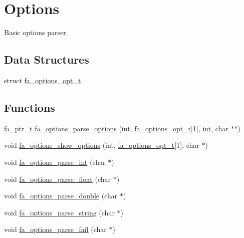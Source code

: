 \hypertarget{group___fa_options}{\section{Options}
\label{group___fa_options}
}


Basic options parser.  


\subsection*{Data Structures}
\begin{DoxyCompactItemize}
\item 
struct \hyperlink{structfa__options__opt__t}{fa\-\_\-options\-\_\-opt\-\_\-t}
\end{DoxyCompactItemize}
\subsection*{Functions}
\begin{DoxyCompactItemize}
\item 
\hyperlink{group___fa_ga915ddeae99ad7568b273d2b876425197}{fa\-\_\-ptr\-\_\-t} \hyperlink{group___fa_options_gafcbb5b5e138d56f49b6b9036d3ce4898}{fa\-\_\-options\-\_\-parse\-\_\-options} (int, \hyperlink{structfa__options__opt__t}{fa\-\_\-options\-\_\-opt\-\_\-t}\mbox{[}1\mbox{]}, int, char $\ast$$\ast$)
\item 
void \hyperlink{group___fa_options_ga9920fa60be31044dc153cf3de05a5c62}{fa\-\_\-options\-\_\-show\-\_\-options} (int, \hyperlink{structfa__options__opt__t}{fa\-\_\-options\-\_\-opt\-\_\-t}\mbox{[}1\mbox{]}, char $\ast$)
\item 
void \hyperlink{group___fa_options_gabff1121d255ac7d409ca0c8e8f2f1dff}{fa\-\_\-options\-\_\-parse\-\_\-int} (char $\ast$)
\item 
void \hyperlink{group___fa_options_gacb1abcba026e5ce78982fe0f83b18ca5}{fa\-\_\-options\-\_\-parse\-\_\-float} (char $\ast$)
\item 
void \hyperlink{group___fa_options_gab506302ba0c006243f4a9499d12cd8a3}{fa\-\_\-options\-\_\-parse\-\_\-double} (char $\ast$)
\item 
void \hyperlink{group___fa_options_ga862975a16f594acca4307e13b6623f2a}{fa\-\_\-options\-\_\-parse\-\_\-string} (char $\ast$)
\item 
void \hyperlink{group___fa_options_ga986ac3c64a1d7bd4fd9f11575931fb02}{fa\-\_\-options\-\_\-parse\-\_\-fail} (char $\ast$)
\end{DoxyCompactItemize}


